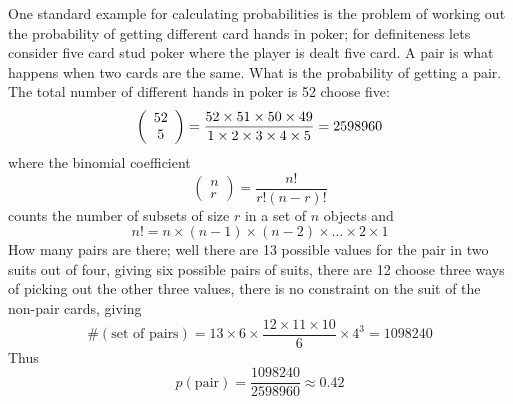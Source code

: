 \documentclass[11pt,a4paper]{scrartcl}
\begin{document}
One standard example for calculating probabilities is the problem of
working out the probability of getting different card hands in poker;
for definiteness lets consider five card stud poker where the player
is dealt five card. A pair is what happens when two cards are the
same. What is the probability of getting a pair. The total number
of different hands in poker is 52 choose five:
\begin{equation}
\left(\begin{array}{c}52\\5\end{array}\right)=\frac{52\times 51\times 50\times 49\time 48}{1\times 2 \times 3 \times 4\times 5}=2598960
\end{equation}
where the binomial coefficient
\begin{equation}
\left(\begin{array}{c}n\\r\end{array}\right)=\frac{n!}{r!(n-r)!}
\end{equation}
counts the number of subsets of size $r$ in a set of $n$ objects and 
\begin{equation}
n!=n\times (n-1)\times (n-2)\times \ldots \times 2 \times 1
\end{equation}
How many pairs are there; well there are 13 possible values for the pair in two suits out of four, giving six possible pairs of suits, there are 12 choose three ways of picking out the other three values, there is no constraint on the suit of the non-pair cards, giving 
\begin{equation}
\#(\mbox{set of pairs})=13\times 6\times \frac{12\times 11\times 10}{6}\times 4^3=1098240
\end{equation}
Thus
\begin{equation}
p(\mbox{pair})=\frac{1098240}{2598960}\approx 0.42
\end{equation}
\end{document}
